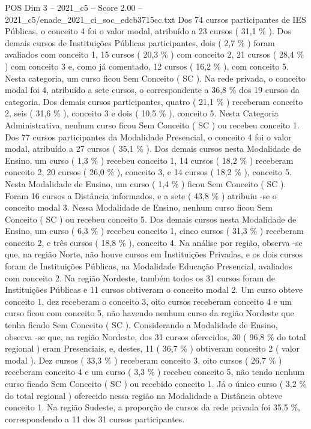 \begin{textsample}{POS Dim 3 – 2021\_c5 – Score 2.00 – 2021\_c5/enade\_2021\_ci\_soc\_edcb3715cc.txt}
Dos 74 cursos participantes de IES Públicas, o conceito 4 foi o valor modal, atribuído a 23 cursos ( 31,1 \% ).
Dos demais cursos de Instituições Públicas participantes, dois ( 2,7 \% ) foram avaliados com conceito 1, 15 cursos ( 20,3 \% ) com conceito 2, 21 cursos ( 28,4 \% ) com conceito 3 e, como já comentado, 12 cursos ( 16,2 \% ), com conceito 5.
Nesta categoria, um curso ficou Sem Conceito ( SC ).
Na rede privada, o conceito modal foi 4, atribuído a sete cursos, o correspondente a 36,8 \% dos 19 cursos da categoria.
Dos demais cursos participantes, quatro ( 21,1 \% ) receberam conceito 2, seis ( 31,6 \% ), conceito 3 e dois ( 10,5 \% ), conceito 5.
Nesta Categoria Administrativa, nenhum curso ficou Sem Conceito ( SC ) ou recebeu conceito 1.
Dos 77 cursos participantes da Modalidade Presencial, o conceito 4 foi o valor modal, atribuído a 27 cursos ( 35,1 \% ).
Dos demais cursos nesta Modalidade de Ensino, um curso ( 1,3 \% ) recebeu conceito 1, 14 cursos ( 18,2 \% ) receberam conceito 2, 20 cursos ( 26,0 \% ), conceito 3, e 14 cursos ( 18,2 \% ), conceito 5.
Nesta Modalidade de Ensino, um curso ( 1,4 \% ) ficou Sem Conceito ( SC ).
Foram 16 cursos a Distância informados, e a sete ( 43,8 \% ) atribuiu -se o conceito modal 3.
Nessa Modalidade de Ensino, nenhum curso ficou Sem Conceito ( SC ) ou recebeu conceito 5.
Dos demais cursos nesta Modalidade de Ensino, um curso ( 6,3 \% ) recebeu conceito 1, cinco cursos ( 31,3 \% ) receberam conceito 2, e três cursos ( 18,8 \% ), conceito 4.
Na análise por região, observa -se que, na região Norte, não houve cursos em Instituições Privadas, e os dois cursos foram de Instituições Públicas, na Modalidade Educação Presencial, avaliados com conceito 2.
Na região Nordeste, também todos os 31 cursos foram de Instituições Públicas e 11 cursos obtiveram o conceito modal 2.
Um curso obteve conceito 1, dez receberam o conceito 3, oito cursos receberam conceito 4 e um curso ficou com conceito 5, não havendo nenhum curso da região Nordeste que tenha ficado Sem Conceito ( SC ).
Considerando a Modalidade de Ensino, observa -se que, na região Nordeste, dos 31 cursos oferecidos, 30 ( 96,8 \% do total regional ) eram Presenciais, e, destes, 11 ( 36,7 \% ) obtiveram conceito 2 ( valor modal ).
Dez cursos ( 33,3 \% ) receberam conceito 3, oito cursos ( 26,7 \% ) receberam conceito 4 e um curso ( 3,3 \% ) recebeu conceito 5, não tendo nenhum curso ficado Sem Conceito ( SC ) ou recebido conceito 1.
Já o único curso ( 3,2 \% do total regional ) oferecido nessa região na Modalidade a Distância obteve conceito 1.
Na região Sudeste, a proporção de cursos da rede privada foi 35,5 \%, correspondendo a 11 dos 31 cursos participantes.

\end{textsample}
